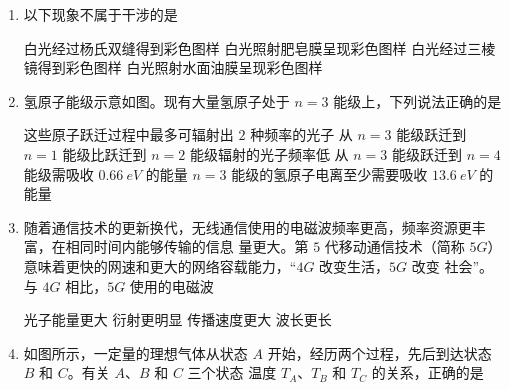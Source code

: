 





\gaokaoxz

\begin{enumerate}
\item
以下现象不属于干涉的是  

\fourchoices
{白光经过杨氏双缝得到彩色图样}
{白光照射肥皂膜呈现彩色图样}
{白光经过三棱镜得到彩色图样}
{白光照射水面油膜呈现彩色图样}


\item
氢原子能级示意如图。现有大量氢原子处于 $ n = 3 $ 能级上，下列说法正确的是  
\begin{figure}[h!]
\centering

\end{figure}

\fourchoices
{这些原子跃迁过程中最多可辐射出 $ 2 $ 种频率的光子}
{从 $ n = 3 $ 能级跃迁到 $ n = 1 $ 能级比跃迁到 $ n = 2 $ 能级辐射的光子频率低}
{从 $ n =3 $ 能级跃迁到 $ n = 4 $ 能级需吸收 $ 0.66 \ eV $ 的能量}
{$ n = 3 $ 能级的氢原子电离至少需要吸收 $ 13.6 \ eV $ 的能量}


\item
随着通信技术的更新换代，无线通信使用的电磁波频率更高，频率资源更丰富，在相同时间内能够传输的信息
量更大。第 $ 5 $ 代移动通信技术（简称 $ 5G $）意味着更快的网速和更大的网络容载能力，“$ 4G $ 改变生活，$ 5G $ 改变
社会”。与 $ 4G $ 相比，$ 5G $ 使用的电磁波  


\fourchoices
{光子能量更大}
{衍射更明显}
{传播速度更大}
{波长更长}



\item
如图所示，一定量的理想气体从状态 $ A $ 开始，经历两个过程，先后到达状态 $ B $ 和 $ C $。有关 $ A $、$ B $ 和 $ C $ 三个状态
温度 $ T_{A} $、$ T_{B} $ 和 $ T_{C} $ 的关系，正确的是  
\begin{figure}[h!]
\centering
{}
\end{figure}
\end{enumerate}
